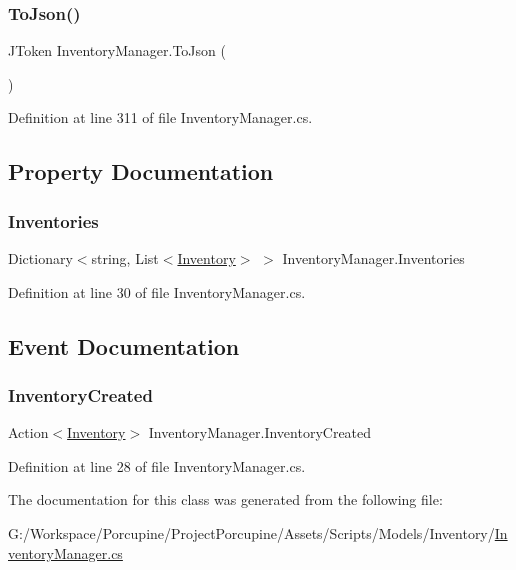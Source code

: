 \subsubsection{\texorpdfstring{To\+Json()}{ToJson()}}
{\footnotesize\ttfamily J\+Token Inventory\+Manager.\+To\+Json (\begin{DoxyParamCaption}{ }\end{DoxyParamCaption})}



Definition at line 311 of file Inventory\+Manager.\+cs.



\subsection{Property Documentation}
\mbox{\label{class_inventory_manager_aad6432658749465392014c8142109b57}} 
\subsubsection{\texorpdfstring{Inventories}{Inventories}}
{\footnotesize\ttfamily Dictionary$<$string, List$<$\hyperlink{class_inventory}{Inventory}$>$ $>$ Inventory\+Manager.\+Inventories\hspace{0.3cm}{\ttfamily [get]}}



Definition at line 30 of file Inventory\+Manager.\+cs.



\subsection{Event Documentation}
\mbox{\label{class_inventory_manager_a43cc3e8fdd6ecf3a16dd5829df28e03a}} 
\subsubsection{\texorpdfstring{Inventory\+Created}{InventoryCreated}}
{\footnotesize\ttfamily Action$<$\hyperlink{class_inventory}{Inventory}$>$ Inventory\+Manager.\+Inventory\+Created}



Definition at line 28 of file Inventory\+Manager.\+cs.



The documentation for this class was generated from the following file\+:\begin{DoxyCompactItemize}
\item 
G\+:/\+Workspace/\+Porcupine/\+Project\+Porcupine/\+Assets/\+Scripts/\+Models/\+Inventory/\hyperlink{_inventory_manager_8cs}{Inventory\+Manager.\+cs}\end{DoxyCompactItemize}
